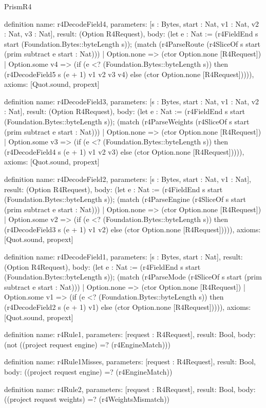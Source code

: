 \begin{lexlean}{PrismR4}
\begin{semanticmodule}
definition{
  name: r4DecodeField4,
  parameters: [s : Bytes, start : Nat, v1 : Nat, v2 : Nat, v3 : Nat],
  result: (Option R4Request),
  body: (let e : Nat := (r4FieldEnd s start (Foundation.Bytes::byteLength s)); (match (r4ParseRoute (r4SliceOf s start (prim subtract e start : Nat)))
    | Option.none => (ctor Option.none [R4Request])
    | Option.some v4 => (if (e <? (Foundation.Bytes::byteLength s)) then (r4DecodeField5 s (e + 1) v1 v2 v3 v4) else (ctor Option.none [R4Request])))),
  axioms: [Quot.sound, propext]
}

definition{
  name: r4DecodeField3,
  parameters: [s : Bytes, start : Nat, v1 : Nat, v2 : Nat],
  result: (Option R4Request),
  body: (let e : Nat := (r4FieldEnd s start (Foundation.Bytes::byteLength s)); (match (r4ParseWeights (r4SliceOf s start (prim subtract e start : Nat)))
    | Option.none => (ctor Option.none [R4Request])
    | Option.some v3 => (if (e <? (Foundation.Bytes::byteLength s)) then (r4DecodeField4 s (e + 1) v1 v2 v3) else (ctor Option.none [R4Request])))),
  axioms: [Quot.sound, propext]
}

definition{
  name: r4DecodeField2,
  parameters: [s : Bytes, start : Nat, v1 : Nat],
  result: (Option R4Request),
  body: (let e : Nat := (r4FieldEnd s start (Foundation.Bytes::byteLength s)); (match (r4ParseEngine (r4SliceOf s start (prim subtract e start : Nat)))
    | Option.none => (ctor Option.none [R4Request])
    | Option.some v2 => (if (e <? (Foundation.Bytes::byteLength s)) then (r4DecodeField3 s (e + 1) v1 v2) else (ctor Option.none [R4Request])))),
  axioms: [Quot.sound, propext]
}

definition{
  name: r4DecodeField1,
  parameters: [s : Bytes, start : Nat],
  result: (Option R4Request),
  body: (let e : Nat := (r4FieldEnd s start (Foundation.Bytes::byteLength s)); (match (r4ParseMode (r4SliceOf s start (prim subtract e start : Nat)))
    | Option.none => (ctor Option.none [R4Request])
    | Option.some v1 => (if (e <? (Foundation.Bytes::byteLength s)) then (r4DecodeField2 s (e + 1) v1) else (ctor Option.none [R4Request])))),
  axioms: [Quot.sound, propext]
}

definition{
  name: r4Rule1,
  parameters: [request : R4Request],
  result: Bool,
  body: (not ((project request engine) =? (r4EngineMatch)))
}

definition{
  name: r4Rule1Misses,
  parameters: [request : R4Request],
  result: Bool,
  body: ((project request engine) =? (r4EngineMatch))
}

definition{
  name: r4Rule2,
  parameters: [request : R4Request],
  result: Bool,
  body: ((project request weights) =? (r4WeightsMismatch))
}


\end{semanticmodule}
\end{lexlean}
